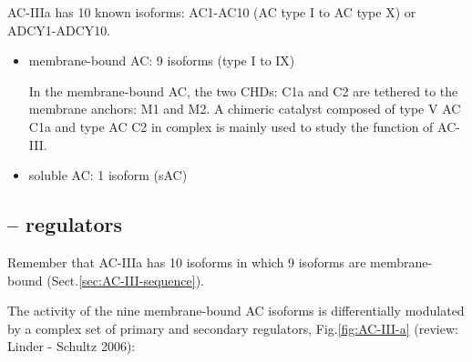 AC-IIIa has 10 known isoforms: AC1-AC10 (AC type I to AC type X) or
ADCY1-ADCY10.

\begin{itemize}
  \item membrane-bound AC: 9 isoforms (type I to IX) 

In the membrane-bound AC, the two CHDs: C1a and C2 are tethered to the membrane
anchors: M1 and M2. A chimeric catalyst composed of type V AC C1a and type AC C2
in complex is mainly used to study the function of AC-III.
  
  \item soluble AC: 1 isoform (sAC)
\end{itemize}

\subsection{-- regulators}
\label{sec:ACIII-regulators}

Remember that AC-IIIa has 10 isoforms in which 9 isoforms are membrane-bound
(Sect.\ref{sec:AC-III-sequence}).

The activity of the nine membrane-bound AC isoforms is differentially modulated
by a complex set of primary and secondary regulators, Fig.\ref{fig:AC-III-a}
(review: Linder - Schultz 2006):

